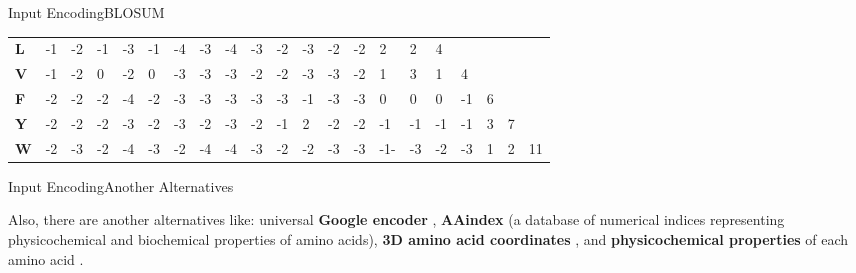 \documentclass[10pt]{beamer}
\newcommand{\1}{
	\setbeamertemplate{background}{
		\texttt{[image: img/1]}
		\tikz[overlay] \fill[fill opacity=0.75,fill=white] (0,0) rectangle (-\paperwidth,\paperheight);
	}
}
\begin{document}
\begin{frame}{Input Encoding}{BLOSUM}
\begin{table}[]
{\begin{tabular}{lllllllllllllllllllll}
				\textbf{L} & -1         & -2         & -1         & -3         & -1         & -4         & -3         & -4         & -3         & -2         & -3         & -2         & -2         & 2          & 2          & 4          &            &            &            &            \\
				\textbf{V} & -1         & -2         & 0          & -2         & 0          & -3         & -3         & -3         & -2         & -2         & -3         & -3         & -2         & 1          & 3          & 1          & 4          &            &            &            \\
				\textbf{F} & -2         & -2         & -2         & -4         & -2         & -3         & -3         & -3         & -3         & -3         & -1         & -3         & -3         & 0          & 0          & 0          & -1         & 6          &            &            \\
				\textbf{Y} & -2         & -2         & -2         & -3         & -2         & -3         & -2         & -3         & -2         & -1         & 2          & -2         & -2         & -1         & -1         & -1         & -1         & 3          & 7          &            \\
				\textbf{W} & -2         & -3         & -2         & -4         & -3         & -2         & -4         & -4         & -3         & -2         & -2         & -3         & -3         & -1-        & -3         & -2         & -3         & 1          & 2          & 11        
			\end{tabular}
			
		}
	\end{table}

\end{frame}


\begin{frame}{Input Encoding}{Another Alternatives}	
	
	\begin{block}{}
		Also, there are another alternatives like: universal \textbf{Google encoder} \cite{kubick2021predicting}, \textbf{AAindex} \cite{kawashima2000aaindex,li2021deepimmuno}  (a database  of numerical indices representing physicochemical and biochemical properties of amino acids), \textbf{3D amino acid coordinates} \cite{shi2020deepantigen}, and \textbf{physicochemical properties} of each amino acid \cite{moris2021current,montemurro2021nettcr,luu2021predicting}. 
	\end{block}
\end{frame}
\end{document}
